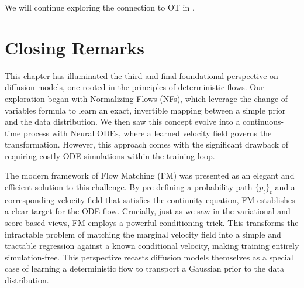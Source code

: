
We will continue exploring the connection to OT in .

\clearpage
\newpage

\newpage
\section{Closing Remarks}\label{sec:ch5_cr}
     
This chapter has illuminated the third and final foundational perspective on diffusion models, one rooted in the principles of deterministic flows. Our exploration began with Normalizing Flows (NFs), which leverage the change-of-variables formula to learn an exact, invertible mapping between a simple prior and the data distribution. We then saw this concept evolve into a continuous-time process with Neural ODEs, where a learned velocity field governs the transformation. However, this approach comes with the significant drawback of requiring costly ODE simulations within the training loop.





The modern framework of Flow Matching (FM) was presented as an elegant and efficient solution to this challenge. By pre-defining a probability path $\{p_{t}\}_t$ and a corresponding velocity field that satisfies the continuity equation, FM establishes a clear target for the ODE flow. Crucially, just as we saw in the variational and score-based views, FM employs a powerful conditioning trick. This transforms the intractable problem of matching the marginal velocity field into a simple and tractable regression against a known conditional velocity, making training entirely simulation-free. This perspective recasts diffusion models themselves as a special case of learning a deterministic flow to transport a Gaussian prior to the data distribution.




